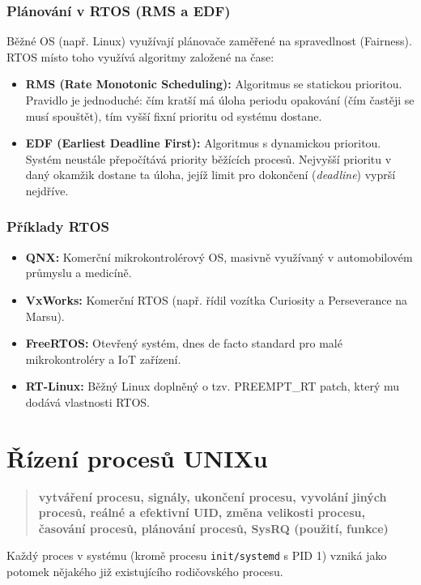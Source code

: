 \subsubsection*{Plánování v RTOS (RMS a EDF)}
Běžné OS (např. Linux) využívají plánovače zaměřené na spravedlnost (Fairness). RTOS místo toho využívá algoritmy založené na čase:
\begin{itemize}
    \item \textbf{RMS (Rate Monotonic Scheduling):} Algoritmus se statickou prioritou. Pravidlo je jednoduché: čím kratší má úloha periodu opakování (čím častěji se musí spouštět), tím vyšší fixní prioritu od systému dostane.
    \item \textbf{EDF (Earliest Deadline First):} Algoritmus s dynamickou prioritou. Systém neustále přepočítává priority běžících procesů. Nejvyšší prioritu v daný okamžik dostane ta úloha, jejíž limit pro dokončení (\textit{deadline}) vyprší nejdříve.
\end{itemize}

\subsubsection*{Příklady RTOS}
\begin{itemize}
    \item \textbf{QNX:} Komerční mikrokontrolérový OS, masivně využívaný v automobilovém průmyslu a medicíně.
    \item \textbf{VxWorks:} Komerční RTOS (např. řídil vozítka Curiosity a Perseverance na Marsu).
    \item \textbf{FreeRTOS:} Otevřený systém, dnes de facto standard pro malé mikrokontroléry a IoT zařízení.
    \item \textbf{RT-Linux:} Běžný Linux doplněný o tzv. PREEMPT\_RT patch, který mu dodává vlastnosti RTOS.
\end{itemize}

\section{Řízení procesů UNIXu}
\begin{quote}
    \textbf{vytváření procesu, signály, ukončení procesu, vyvolání jiných procesů, reálné a efektivní UID, změna velikosti procesu, časování procesů, plánování procesů, SysRQ (použití, funkce)}
\end{quote}
Každý proces v systému (kromě procesu \texttt{init/systemd} s PID 1) vzniká jako potomek nějakého již existujícího rodičovského procesu.

